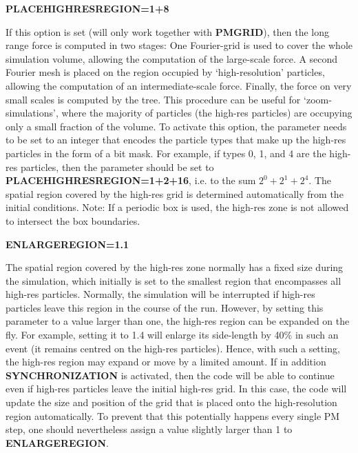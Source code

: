 \begin{DoxyItemize}
\item {\bfseries PLACEHIGHRESREGION=1+8} \par
 If this option is set (will only work together with {\bfseries PMGRID}), then the long range force is computed in two stages: One Fourier-\/grid is used to cover the whole simulation volume, allowing the computation of the large-\/scale force. A second Fourier mesh is placed on the region occupied by `high-\/resolution' particles, allowing the computation of an intermediate-\/scale force. Finally, the force on very small scales is computed by the tree. This procedure can be useful for `zoom-\/simulations', where the majority of particles (the high-\/res particles) are occupying only a small fraction of the volume. To activate this option, the parameter needs to be set to an integer that encodes the particle types that make up the high-\/res particles in the form of a bit mask. For example, if types 0, 1, and 4 are the high-\/res particles, then the parameter should be set to {\bfseries PLACEHIGHRESREGION=1+2+16}, i.e. to the sum $2^0+2^1+2^4$. The spatial region covered by the high-\/res grid is determined automatically from the initial conditions. Note: If a periodic box is used, the high-\/res zone is not allowed to intersect the box boundaries.
\end{DoxyItemize}


\begin{DoxyItemize}
\item {\bfseries  ENLARGEREGION=1.1} \par
 The spatial region covered by the high-\/res zone normally has a fixed size during the simulation, which initially is set to the smallest region that encompasses all high-\/res particles. Normally, the simulation will be interrupted if high-\/res particles leave this region in the course of the run. However, by setting this parameter to a value larger than one, the high-\/res region can be expanded on the fly. For example, setting it to 1.4 will enlarge its side-\/length by 40\% in such an event (it remains centred on the high-\/res particles). Hence, with such a setting, the high-\/res region may expand or move by a limited amount. If in addition {\bfseries SYNCHRONIZATION} is activated, then the code will be able to continue even if high-\/res particles leave the initial high-\/res grid. In this case, the code will update the size and position of the grid that is placed onto the high-\/resolution region automatically. To prevent that this potentially happens every single PM step, one should nevertheless assign a value slightly larger than 1 to {\bfseries ENLARGEREGION}.
\end{DoxyItemize}


